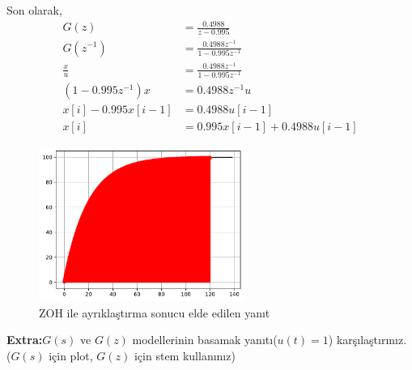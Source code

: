 Son olarak,
\begin{equation}
    \begin{split}
        G(z)&=\frac{0.4988}{z-0.995}\\
        G(z^{-1})&=\frac{0.4988z^{-1}}{1-0.995z^{-1}}\\
        \frac{x}{u}&=\frac{0.4988z^{-1}}{1-0.995z^{-1}}\\
        (1-0.995z^{-1})x&=0.4988z^{-1}u\\
        x[i]-0.995x[i-1]&=0.4988u[i-1]\\
        x[i]&=0.995x[i-1]+0.4988u[i-1]
    \end{split}
\end{equation}

\begin{figure}[!htb]
    \centering
    \includegraphics[width=0.6\textwidth]{q1.pdf}
    \caption{ZOH ile ayrıklaştırma sonucu elde edilen yanıt}\label{fig:q1}
\end{figure}

\noindent\textbf{Extra:}$G(s)$ ve $G(z)$ modellerinin basamak yanıtı($u(t)=1$) karşılaştırınız. ($G(s)$ için plot, $G(z)$ için stem kullanınız)


